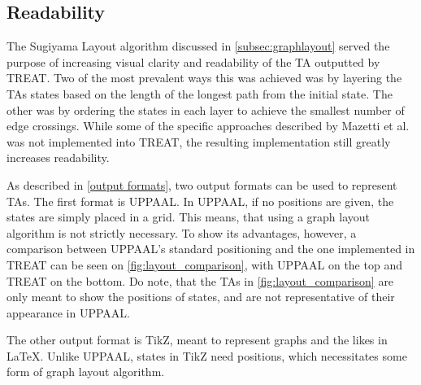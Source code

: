 \subsection{Readability}

The Sugiyama Layout algorithm discussed in \cref{subsec:graphlayout} served the purpose of increasing visual clarity and readability of the TA outputted by TREAT.
Two of the most prevalent ways this was achieved was by layering the TAs states based on the length of the longest path from the initial state. The other was by ordering the states in each layer to achieve the smallest number of edge crossings.
While some of the specific approaches described by Mazetti et al. \cite{Mazetti2012} was not implemented into TREAT, the resulting implementation still greatly increases readability.

As described in \cref{output formats}, two output formats can be used to represent TAs. The first format is UPPAAL. In UPPAAL, if no positions are given, the states are simply placed in a grid. This means, that using a graph layout algorithm is not strictly necessary. To show its advantages, however, a comparison between UPPAAL's standard positioning and the one implemented in TREAT can be seen on \cref{fig:layout_comparison}, with UPPAAL on the top and TREAT on the bottom.
Do note, that the TAs in \cref{fig:layout_comparison} are only meant to show the positions of states, and are not representative of their appearance in UPPAAL.

\begin{center}
    
\end{center}

\vspace{1em}

The other output format is TikZ, meant to represent graphs and the likes in LaTeX. Unlike UPPAAL, states in TikZ need positions, which necessitates some form of graph layout algorithm.



